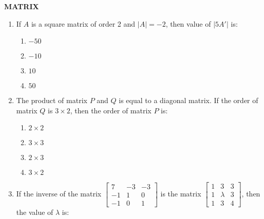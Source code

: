 \documentclass[12pt,-letter paper]{article}
\providecommand{\myvec}[1]{\ensuremath{\begin{bmatrix}#1\end{bmatrix}}}
\providecommand{\brak}[1]{\ensuremath{\left(#1\right)}}
\begin{document}
\begin{center}                                                              \textbf{MATRIX}                                                     \end{center}                                                                                                                         \begin{enumerate}                                         \item If $A$ is a square matrix of order 2 and $|A| = -2$, then  value of $|5A'|$ is:                                                            \begin{enumerate}[label={$\brak{\Alph*}$}]
        \item $-50$
        \item $-10$                                                             \item $10$                                                              \item $50$                                                          \end{enumerate}                                                                                                                                 \item The product of matrix $P$ and $Q$ is equal to a diagonal matrix. If the order of matrix $Q$ is $ 3 \times 2 $, then the order of matrix $P$ is:                                                                   \begin{enumerate}[label={$\brak{\Alph*}$}]                                  \item $2 \times 2$                                                      \item $3 \times 3$                                                      \item $2 \times 3$                                                      \item $3 \times 2$                                                          \end{enumerate}                                                                                                                        \item If the inverse of the matrix $\myvec{7 & -3 & -3 \\ -1 & 1 & 0 \\ -1 & 0 & 1}$ is the matrix $\myvec{1 & 3 & 3 \\ 1 & \lambda & 3 \\ 1 & 3 & 4}$, then the value of $\lambda$ is:

\end{enumerate}
\end{document}
